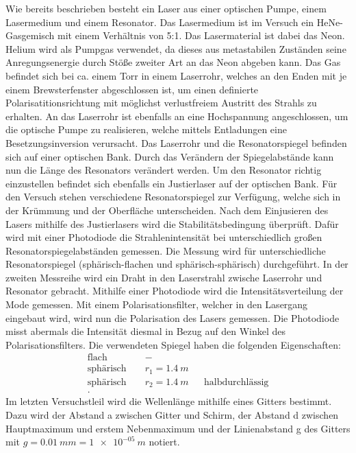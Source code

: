 Wie bereits beschrieben besteht ein Laser aus einer optischen Pumpe, einem Lasermedium und einem Resonator.
Das Lasermedium ist im Versuch ein HeNe-Gasgemisch mit einem Verhältnis von 5:1.
Das Lasermaterial ist dabei das Neon.
Helium wird als Pumpgas verwendet, da dieses aus metastabilen Zuständen seine Anregungsenergie durch Stöße zweiter Art an das Neon abgeben kann.
Das Gas befindet sich bei ca. einem Torr in einem Laserrohr, welches an den Enden mit je einem Brewsterfenster abgeschlossen ist, um einen
definierte Polarisatitionsrichtung mit möglichst verlustfreiem Austritt des Strahls zu erhalten.
An das Laserrohr ist ebenfalls an eine Hochspannung angeschlossen, um die optische Pumpe zu realisieren, welche mittels Entladungen eine Besetzungsinversion verursacht.
Das Laserrohr und die Resonatorspiegel befinden sich auf einer optischen Bank.
Durch das Verändern der Spiegelabstände kann nun die Länge des Resonators verändert werden.
Um den Resonator richtig einzustellen befindet sich ebenfalls ein Justierlaser auf der optischen Bank.
Für den Versuch stehen verschiedene Resonatorspiegel zur Verfügung, welche sich in der Krümmung und der Oberfläche unterscheiden.
Nach dem Einjusieren des Lasers mithilfe des Justierlasers wird die Stabilitätsbedingung überprüft.
Dafür wird mit einer Photodiode die Strahlenintensität bei unterschiedlich großen Resonatorspiegelabständen gemessen.
Die Messung wird für unterschiedliche Resonatorspiegel (sphärisch-flachen und sphärisch-sphärisch) durchgeführt.
In der zweiten Messreihe wird ein Draht in den Laserstrahl zwische Laserrohr und Resonator gebracht.
Mithilfe einer Photodiode wird die Intensitätsverteilung der Mode gemessen.
%
Mit einem Polarisationsfilter, welcher in den Lasergang eingebaut wird, wird nun die Polarisation des Lasers gemessen.
Die Photodiode misst abermals die Intensität diesmal in Bezug auf den Winkel des Polarisationsfilters.
%
Die verwendeten Spiegel haben die folgenden Eigenschaften:
\begin{align*}
\text{flach }      &&       -       && \\
\text{sphärisch }  && r_{1}=\SI{1.4}{m} && \\
\text{sphärisch }  && r_{2}=\SI{1.4}{m} && \text{halbdurchlässig}\\.
\end{align*}
%
Im letzten Versuchstleil wird die Wellenlänge mithilfe eines Gitters bestimmt.
Dazu wird der Abstand a zwischen Gitter und Schirm, der Abstand d zwischen Hauptmaximum und erstem Nebenmaximum und der Linienabstand g des Gitters mit $g= \SI{0.01}{mm}=\SI{1e-05}{m}$ notiert.
